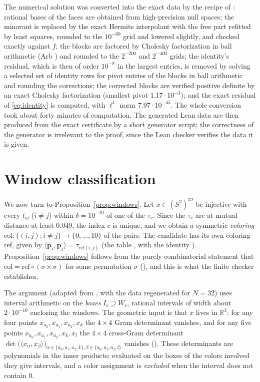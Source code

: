 \documentclass[11pt]{amsart}
\theoremstyle{definition}
\theoremstyle{remark}
\newcommand{\R}{\mathbb{R}}
\newcommand{\Sph}{S^{2}}
\newcommand{\ip}[2]{\langle #1,#2\rangle}
\newcommand{\cand}{\mathbf{p}}
\begin{document}
The numerical solution was converted into the exact data by the recipe of \cite{ThomsonN9}: rational bases of the faces are obtained from high-precision null spaces; the minorant is replaced by the exact Hermite interpolant with the free part refitted by least squares, rounded to the $10^{-60}$ grid and lowered slightly, and checked exactly against $f$; the blocks are factored by Cholesky factorization in ball arithmetic (Arb \cite{Arb}) and rounded to the $2^{-200}$ and $2^{-400}$ grids; the identity's residual, which is then of order $10^{-8}$ in the largest entries, is removed by solving a selected set of identity rows for pivot entries of the blocks in ball arithmetic and rounding the corrections; the corrected blocks are verified positive definite by an exact Cholesky factorization (smallest pivot $1.17\cdot10^{-3}$); and the exact residual of \eqref{eq:identity} is computed, with $\ell^{1}$ norm $7.97\cdot10^{-45}$. The whole conversion took about forty minutes of computation. The generated Lean data are then produced from the exact certificate by a short generator script; the correctness of the generator is irrelevant to the proof, since the Lean checker verifies the data it is given.

\section{Window classification}\label{sec:windows}

We now turn to Proposition~\ref{prop:windows}. Let $x\in(\Sph)^{32}$ be injective with every $t_{ij}$ ($i\ne j$) within $\delta=10^{-10}$ of one of the $\tau_c$. Since the $\tau_c$ are at mutual distance at least $0.049$, the index $c$ is unique, and we obtain a symmetric \emph{coloring} $\mathrm{col}\colon\{(i,j):i\ne j\}\to\{0,\dots,10\}$ of the pairs. The candidate has its own coloring $\mathrm{ref}$, given by $\ip{\cand_i}{\cand_j}=\tau_{\mathrm{ref}(i,j)}$ (the table , with the identity ). Proposition~\ref{prop:windows} follows from the purely combinatorial statement that $\mathrm{col}=\mathrm{ref}\circ(\sigma\times\sigma)$ for some permutation $\sigma$ (), and this is what the finite checker establishes.

The argument (adapted from \cite{ThomsonN9}, with the data regenerated for $N=32$) uses interval arithmetic on the \emph{boxes} $I_c\supseteq W_c$, rational intervals of width about $2\cdot10^{-10}$ enclosing the windows. The geometric input is that $x$ lives in $\R^{3}$: for any four points $x_{a_0},x_{a_1},x_{a_2},x_k$ the $4\times4$ Gram determinant vanishes, and for any five points $x_{a_0},x_{a_1},x_{a_2},x_k,x_l$ the $4\times4$ cross-Gram determinant $\det\bigl(\ip{x_\alpha}{x_\beta}\bigr)_{\alpha\in\{a_0,a_1,a_2,k\},\beta\in\{a_0,a_1,a_2,l\}}$ vanishes (). These determinants are polynomials in the inner products; evaluated on the boxes of the colors involved they give intervals, and a color assignment is \emph{excluded} when the interval does not contain $0$.
\end{document}

